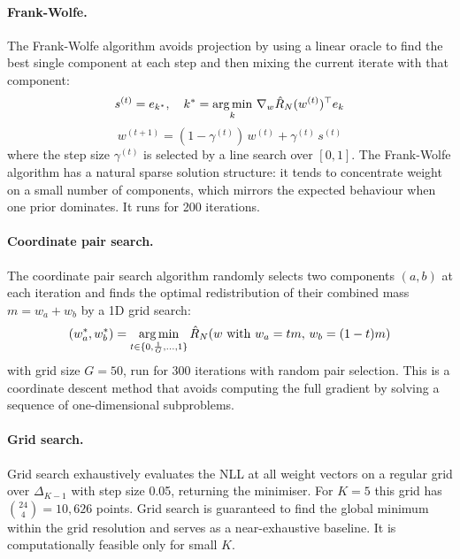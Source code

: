 \paragraph{Frank-Wolfe.}

The Frank-Wolfe algorithm \citet{frank1956} avoids projection by 
using a linear oracle to find the 
best single component at each step 
and then mixing the current iterate 
with that component:
\begin{equation}
    s^{(t)} = e_{k^*}, \quad 
    k^* = \operatorname*{arg\,min}_k\, 
    \nabla_w \hat{R}_N(w^{(t)})^\top 
    e_k
\end{equation}
\begin{equation}
    w^{(t+1)} = (1-\gamma^{(t)})\, 
    w^{(t)} + \gamma^{(t)}\, s^{(t)}
\end{equation}
where the step size $\gamma^{(t)}$ 
is selected by a line search over 
$[0,1]$. The Frank-Wolfe algorithm 
has a natural sparse solution 
structure: it tends to concentrate 
weight on a small number of components, 
which mirrors the expected behaviour 
when one prior dominates. It runs for 
200 iterations.

\paragraph{Coordinate pair search.}

The coordinate pair search algorithm 
randomly selects two components $(a, b)$ 
at each iteration and finds the optimal 
redistribution of their combined mass 
$m = w_a + w_b$ by a 1D grid search:
\begin{equation}
    (w_a^*, w_b^*) = \operatorname*{arg\,min}_{t \in 
    \{0, \frac{1}{G}, \ldots, 1\}} 
    \hat{R}_N(w \text{ with } 
    w_a = tm,\, w_b = (1-t)m)
\end{equation}
with grid size $G = 50$, run for 300 
iterations with random pair selection. 
This is a coordinate descent method 
that avoids computing the full gradient 
by solving a sequence of one-dimensional 
subproblems.

\paragraph{Grid search.}

Grid search exhaustively evaluates 
the NLL at all weight vectors on a 
regular grid over $\Delta_{K-1}$ with 
step size 0.05, returning the minimiser. 
For $K = 5$ this grid has $\binom{24}{4} 
= 10{,}626$ points. Grid search is 
guaranteed to find the global minimum 
within the grid resolution and serves 
as a near-exhaustive baseline. It is 
computationally feasible only for 
small $K$.

